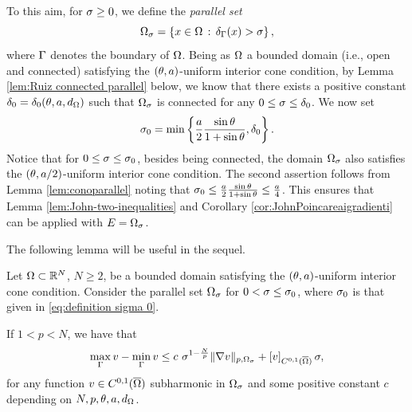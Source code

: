 \documentclass[a4paper,10pt]{amsart}
\numberwithin{equation}{section}
\begin{document}
To this aim, for $\sigma \ge 0$, we define the \textit{parallel set}
\begin{equation*}\label{eq:Omegasigma}
\Omega_\sigma= \left\{x \in \Omega \, : \, \delta_{\Gamma} (x) > \sigma \right\} ,
\end{equation*}
where $\Gamma$ denotes the boundary of $\Omega$.
Being as $\Omega$ a bounded domain (i.e., open and connected) satisfying the $(\theta, a)$-uniform interior cone condition, by Lemma \ref{lem:Ruiz connected parallel} below, we know that there exists a positive constant $\delta_0=\delta_0 (\theta, a , d_\Omega)$ such that $\Omega_\sigma$ is connected for any $0 \le \sigma \le \delta_0$.
We now set 
\begin{equation}\label{eq:definition sigma 0}
\sigma_0= \min \left\{ \frac{a}{2} \frac{\sin \theta}{ 1 + \sin \theta } , \delta_0 \right\} .
\end{equation}
Notice that for $0 \le \sigma \le \sigma_0 $, besides being connected, the domain $\Omega_\sigma$ also satisfies the $(\theta, a/2)$-uniform interior cone condition. The second assertion follows from Lemma \ref{lem:conoparallel} noting that $\sigma_0 \le \frac{a}{2} \frac{\sin \theta}{ 1 + \sin \theta } \le \frac{a}{4} $.
This ensures that Lemma \ref{lem:John-two-inequalities} and Corollary \ref{cor:JohnPoincareaigradienti} can be applied with $E=\Omega_\sigma$.



The following lemma will be useful in the sequel.

\begin{lem}\label{lem:general v primo step per caso al >1}
Let $\Omega  \subset \mathbb{R}^N$, $N\ge2$, be a bounded domain satisfying the $(\theta,a)$-uniform interior cone condition. Consider the parallel set $\Omega_\sigma$ for  $0 < \sigma \le \sigma_0 $, where $\sigma_0$ is that given in \eqref{eq:definition sigma 0}.
\par
If $1<p<N$, we have that
\begin{equation*}
	\max_{\Gamma} v - \min_{\Gamma} v \le c  \, \, \sigma^{1-\frac{N}{p}} \Vert \nabla v \Vert_{p, \Omega_\sigma} + \left[ v \right]_{C^{0,1}(\overline{\Omega})} \sigma,
\end{equation*}
for any function $v \in C^{0,1}( \overline{ \Omega } )$ subharmonic in $\Omega_\sigma$ 
and some positive constant $c$ depending on $N, p, \theta, a, d_\Omega$.
\end{lem}
\end{document}
